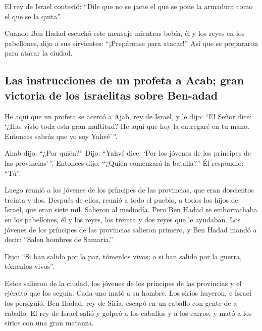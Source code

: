 \begin{paracol}{2}
 El rey de Israel contestó: ``Dile que no se jacte el que
se pone la armadura como el que se la quita''.

 Cuando Ben Hadad escuchó este mensaje mientras bebía, él
y los reyes en los pabellones, dijo a sus sirvientes: ``¡Prepárense para
atacar!'' Así que se prepararon para atacar la ciudad.

\hypertarget{las-instrucciones-de-un-profeta-a-acab-gran-victoria-de-los-israelitas-sobre-ben-adad}{%
\subsection{Las instrucciones de un profeta a Acab; gran victoria de los
israelitas sobre
Ben-adad}\label{las-instrucciones-de-un-profeta-a-acab-gran-victoria-de-los-israelitas-sobre-ben-adad}}

 He aquí que un profeta se acercó a Ajab, rey de Israel,
y le dijo: ``El Señor dice: `¿Has visto toda esta gran multitud? He aquí
que hoy la entregaré en tu mano. Entonces sabrás que yo soy Yahvé'\,''.

 Ahab dijo: ``¿Por quién?'' Dijo: ``Yahvé dice: `Por los
jóvenes de los príncipes de las provincias'\,''. Entonces dijo: ``¿Quién
comenzará la batalla?'' Él respondió: ``Tú''.

 Luego reunió a los jóvenes de los príncipes de las
provincias, que eran doscientos treinta y dos. Después de ellos, reunió
a todo el pueblo, a todos los hijos de Israel, que eran siete mil.
 Salieron al mediodía. Pero Ben Hadad se emborrachaba en
los pabellones, él y los reyes, los treinta y dos reyes que le ayudaban.
 Los jóvenes de los príncipes de las provincias salieron
primero, y Ben Hadad mandó a decir: ``Salen hombres de Samaria.''

 Dijo: ``Si han salido por la paz, tómenlos vivos; o si
han salido por la guerra, tómenlos vivos''.

 Estos salieron de la ciudad, los jóvenes de los
príncipes de las provincias y el ejército que los seguía.
 Cada uno mató a su hombre. Los sirios huyeron, e Israel
los persiguió. Ben Hadad, rey de Siria, escapó en un caballo con gente
de a caballo.  El rey de Israel salió y golpeó a los
caballos y a los carros, y mató a los sirios con una gran matanza.

\hypertarget{segunda-campauxf1a-de-benhadad-nueva-instrucciuxf3n-del-profeta-a-acab-asesorar-a-los-sirios-victoria-de-los-israelitas}{%
}
\end{paracol}

